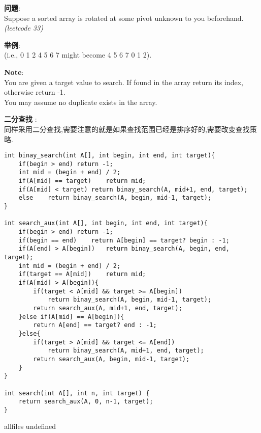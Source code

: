 \documentclass{article}
\begin{document}
\begin{CJK}{UTF8}{gbsn}     %

\else
    
\begin{description}
    \item{\textbf{问题}}: \\
Suppose a sorted array is rotated at some pivot unknown to you beforehand.\textit{(leetcode 33)}
    \item{\textbf{举例}}: \\
(i.e., 0 1 2 4 5 6 7 might become 4 5 6 7 0 1 2).
    \item{\textbf{Note}}: \\
You are given a target value to search. If found in the array return its index, otherwise return -1.\\
You may assume no duplicate exists in the array.\\
    \item{\textbf{二分查找}} : 
    \\同样采用二分查找,需要注意的就是如果查找范围已经是排序好的,需要改变查找策略.
    \begin{lstlisting}
int binay_search(int A[], int begin, int end, int target){
	if(begin > end)	return -1;
	int mid = (begin + end) / 2;
	if(A[mid] == target)	return mid;
	if(A[mid] < target)	return binay_search(A, mid+1, end, target);
	else	return binay_search(A, begin, mid-1, target);
}

int search_aux(int A[], int begin, int end, int target){
	if(begin > end)	return -1;
	if(begin == end)	return A[begin] == target? begin : -1;
	if(A[end] > A[begin])	return binay_search(A, begin, end, target);
	int mid = (begin + end) / 2;
	if(target == A[mid])	return mid;
	if(A[mid] > A[begin]){
		if(target < A[mid] && target >= A[begin])
			return binay_search(A, begin, mid-1, target);
		return search_aux(A, mid+1, end, target);
	}else if(A[mid] == A[begin]){
		return A[end] == target? end : -1;
	}else{
		if(target > A[mid] && target <= A[end])
			return binay_search(A, mid+1, end, target);
		return search_aux(A, begin, mid-1, target);
	}
}

int search(int A[], int n, int target) {
	return search_aux(A, 0, n-1, target);
}
    \end{lstlisting}
    \textit{}
\end{description}

\fi

\ifx allfiles undefined
\end{CJK}
\end{document}
